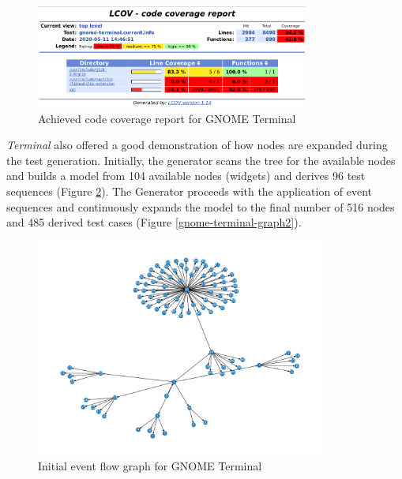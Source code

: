 \begin{figure}[H]
	\centering
	\includegraphics[width=0.8\textwidth,clip]{obrazky-figures/gnome-termina-coverage.png}
	\caption{Achieved code coverage report for GNOME Terminal}
	\label{gnome-terminal-coverage}
\end{figure}

\textit{Terminal} also offered a good demonstration of how nodes are expanded during the test generation. Initially, the generator scans the tree for the available nodes and builds a model from 104 available nodes (widgets) and derives 96 test sequences (Figure \ref{gnome-terminal-graph1}). The Generator proceeds with the application of event sequences and continuously expands the model to the final number of 516 nodes and 485 derived test cases (Figure \ref{gnome-terminal-graph2}).

\begin{figure}[H]
	\centering
	\includegraphics[width=0.85\textwidth,clip]{obrazky-figures/gnome-terminal_n_start.png}
	\caption{Initial event flow graph for GNOME Terminal}
	\label{gnome-terminal-graph1}
\end{figure}

